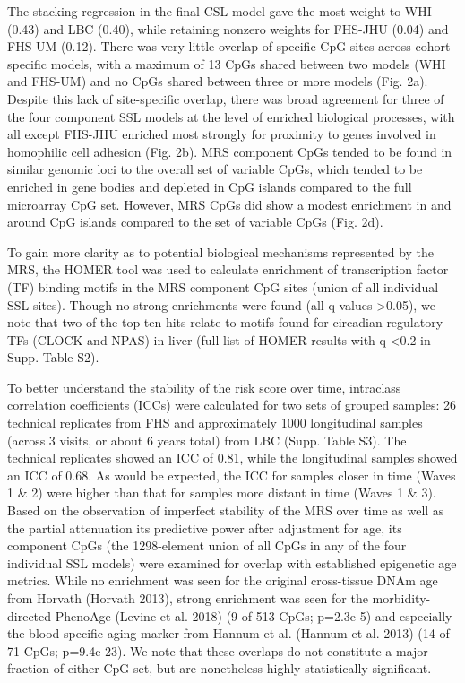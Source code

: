 \documentclass[]{article}
\begin{document}
The stacking regression in the final CSL model gave the most weight to
WHI (0.43) and LBC (0.40), while retaining nonzero weights for FHS-JHU
(0.04) and FHS-UM (0.12). There was very little overlap of specific CpG
sites across cohort-specific models, with a maximum of 13 CpGs shared
between two models (WHI and FHS-UM) and no CpGs shared between three or
more models (Fig. 2a). Despite this lack of site-specific overlap, there
was broad agreement for three of the four component SSL models at the
level of enriched biological processes, with all except FHS-JHU enriched
most strongly for proximity to genes involved in homophilic cell
adhesion (Fig. 2b). MRS component CpGs tended to be found in similar
genomic loci to the overall set of variable CpGs, which tended to be
enriched in gene bodies and depleted in CpG islands compared to the full
microarray CpG set. However, MRS CpGs did show a modest enrichment in
and around CpG islands compared to the set of variable CpGs (Fig. 2d).

To gain more clarity as to potential biological mechanisms represented
by the MRS, the HOMER tool was used to calculate enrichment of
transcription factor (TF) binding motifs in the MRS component CpG sites
(union of all individual SSL sites). Though no strong enrichments were
found (all q-values \textgreater{}0.05), we note that two of the top ten
hits relate to motifs found for circadian regulatory TFs (CLOCK and
NPAS) in liver (full list of HOMER results with q \textless{}0.2 in
Supp. Table S2).

To better understand the stability of the risk score over time,
intraclass correlation coefficients (ICCs) were calculated for two sets
of grouped samples: 26 technical replicates from FHS and approximately
1000 longitudinal samples (across 3 visits, or about 6 years total) from
LBC (Supp. Table S3). The technical replicates showed an ICC of 0.81,
while the longitudinal samples showed an ICC of 0.68. As would be
expected, the ICC for samples closer in time (Waves 1 \& 2) were higher
than that for samples more distant in time (Waves 1 \& 3). Based on the
observation of imperfect stability of the MRS over time as well as the
partial attenuation its predictive power after adjustment for age, its
component CpGs (the 1298-element union of all CpGs in any of the four
individual SSL models) were examined for overlap with established
epigenetic age metrics. While no enrichment was seen for the original
cross-tissue DNAm age from Horvath (Horvath 2013), strong enrichment was
seen for the morbidity-directed PhenoAge (Levine et al. 2018) (9 of 513
CpGs; p=2.3e-5) and especially the blood-specific aging marker from
Hannum et al. (Hannum et al. 2013) (14 of 71 CpGs; p=9.4e-23). We note
that these overlaps do not constitute a major fraction of either CpG
set, but are nonetheless highly statistically significant.
\end{document}
